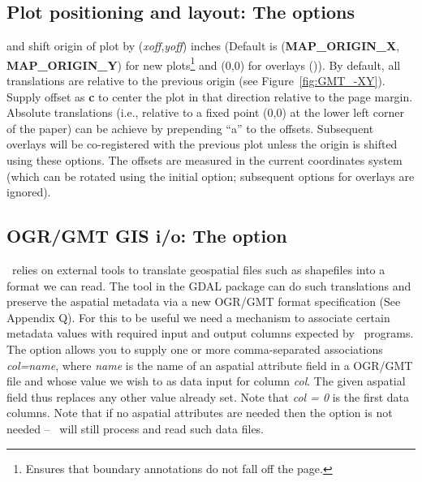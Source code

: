 \subsection{Plot positioning and layout: The   options}

 and  shift origin of plot by (\emph{xoff},\emph{yoff})
inches (Default is (\textbf{MAP\_ORIGIN\_X}, \textbf{MAP\_ORIGIN\_Y}) for new plots\footnote{Ensures that
boundary annotations do not fall off the page.} and (0,0) for overlays ()).
By default, all translations are relative to the previous origin
(see Figure~\ref{fig:GMT_-XY}).  Supply offset as \textbf{c} to center the
plot in that direction relative to the page margin.
Absolute translations (i.e., relative to a fixed point (0,0) at the
lower left corner of the paper) can be achieve by prepending ``a''
to the offsets.  Subsequent overlays will be co-registered with the
previous plot unless the origin is shifted using these options.
The offsets are measured in the current coordinates system (which can
be rotated using the initial  option; subsequent  options
for overlays are ignored).

\subsection{OGR/GMT GIS i/o: The  option}

\GMT\ relies on external tools to translate geospatial files such as shapefiles
into a format we can read.  The tool  in the GDAL package can do such
translations and preserve the aspatial metadata via a new OGR/GMT format
specification (See Appendix Q).  For this to be useful we need a mechanism
to associate certain metadata values with required input and output columns expected
by \GMT\ programs.  The  option allows you to supply one or more
comma-separated associations {\it col=name}, where
{\it name} is the name of an aspatial attribute field in a OGR/GMT file
and whose value we wish to as data input for column {\it col}.  The
given aspatial field thus replaces any other value already set.  Note
that {\it col = 0} is the first data columns.  Note that if no aspatial attributes
are needed then the  option is not needed -- \GMT\ will still process
and read such data files.

